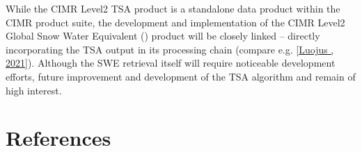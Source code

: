 \documentclass[letterpaper,10pt,english]{jupyterBook}
\begin{document}
\sphinxAtStartPar
While the CIMR Level\sphinxhyphen{}2 TSA product is a stand\sphinxhyphen{}alone data product within the CIMR product suite, the development and implementation of the CIMR Level\sphinxhyphen{}2 Global Snow Water Equivalent ({\hyperref[\detokenize{book/acronyms:term-SWE}]{}}) product will be closely linked – directly incorporating the TSA output in its processing chain (compare e.g. {[}\hyperlink{cite.book/references:id22}{Luojus , 2021}{]}).
Although the SWE retrieval itself will require noticeable development efforts, future improvement and development of the TSA algorithm and {\hyperref[\detokenize{book/acronyms:term-ATBD}]{}} remain of high interest.

\sphinxstepscope


\chapter{References}
\label{\detokenize{book/references:references}}\label{\detokenize{book/references::doc}}
\sphinxstepscope
\end{document}
